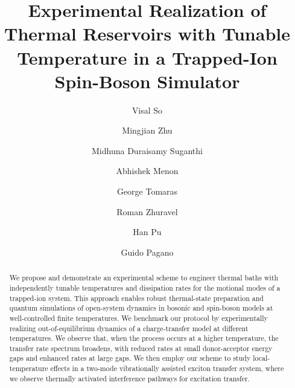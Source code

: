 \documentclass[
reprint,
superscriptaddress,

amsmath,amssymb,
aps,
prl,

floatfix,
]{revtex4-2}
\begin{document}
\raggedbottom

\title{Experimental Realization of Thermal Reservoirs with Tunable Temperature in a Trapped-Ion Spin-Boson Simulator}

\author{Visal So}
\author{Mingjian Zhu}
\author{Midhuna Duraisamy Suganthi}
\author{Abhishek Menon}
\author{George Tomaras}
\author{Roman Zhuravel}
\author{Han Pu}
\author{Guido Pagano}

\begin{abstract}
    We propose and demonstrate an experimental scheme to engineer thermal baths with independently tunable temperatures and dissipation rates for the motional modes of a trapped-ion system. This approach enables robust thermal-state preparation and quantum simulations of open-system dynamics in bosonic and spin-boson models at well-controlled finite temperatures. We benchmark our protocol by experimentally realizing out-of-equilibrium dynamics of a charge-transfer model at different temperatures. We observe that, when the process occurs at a higher temperature, the transfer rate spectrum broadens, with reduced rates at small donor-acceptor energy gaps and enhanced rates at large gaps. We then employ our scheme to study local-temperature effects in a two-mode vibrationally assisted exciton transfer system, where we observe thermally activated interference pathways for excitation transfer.
\end{abstract}
\end{document}
